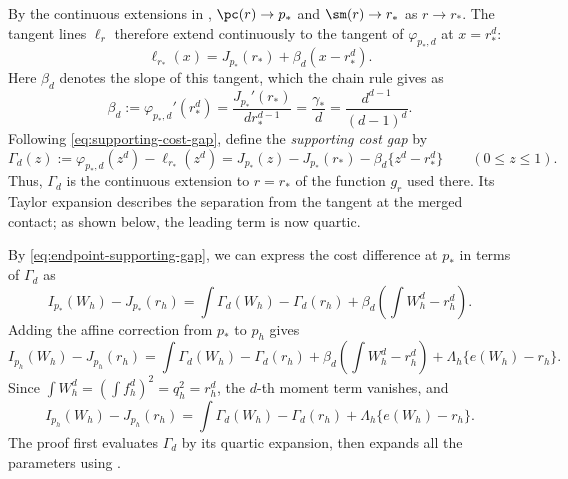 By the continuous extensions in ,
$\pc(r)\to p_*$ and $\sm(r)\to r_*$ as $r\to r_*$.  The tangent lines
$\ell_r$ therefore extend continuously to the tangent of
$\varphi_{p_*,d}$ at $x=r_*^d$:
\[
  \ell_{r_*}(x)=J_{p_*}(r_*)+\beta_d(x-r_*^d).
\]
Here $\beta_d$ denotes the slope of this tangent, which the chain rule gives as
\[
  \beta_d:=\varphi_{p_*,d}'(r_*^d)
  =\frac{J_{p_*}'(r_*)}{d r_*^{d-1}}
  =\frac{\gamma_*}{d}
  =\frac{d^{d-1}}{(d-1)^d}.
\]
Following \eqref{eq:supporting-cost-gap}, define the \emph{supporting cost gap} by
\begin{equation}\label{eq:endpoint-supporting-gap}
  \Gamma_d(z)
  :=\varphi_{p_*,d}(z^d)-\ell_{r_*}(z^d)
  =J_{p_*}(z)-J_{p_*}(r_*)-\beta_d\{z^d-r_*^d\}
  \qquad(0\le z\le1).
\end{equation}
Thus, $\Gamma_d$ is the continuous extension to $r=r_*$ of the function
$g_r$ used there.  Its Taylor expansion describes the separation from
the tangent at the merged contact; as shown below, the leading term is
now quartic.

By \eqref{eq:endpoint-supporting-gap}, we can express the cost difference
at $p_*$ in terms of $\Gamma_d$ as
\[
  I_{p_*}(W_h)-J_{p_*}(r_h)
  =\int\Gamma_d(W_h)-\Gamma_d(r_h)+\beta_d\left(\int W_h^d-r_h^d\right).
\]
Adding the affine correction from $p_*$ to $p_h$ gives
\begin{equation}\label{eq:constant-comparison-decomposition}
  I_{p_h}(W_h)-J_{p_h}(r_h)
  =\int\Gamma_d(W_h)-\Gamma_d(r_h)
  +\beta_d\left(\int W_h^d-r_h^d\right)
  +\Lambda_h\{e(W_h)-r_h\}.
\end{equation}
Since $\int W_h^d=(\int f_h^d)^2=q_h^2=r_h^d$, the $d$-th moment term vanishes, and
\begin{equation}\label{eq:constant-comparison-identity}
  I_{p_h}(W_h)-J_{p_h}(r_h)
  =\int\Gamma_d(W_h)-\Gamma_d(r_h) +\Lambda_h\{e(W_h)-r_h\}.
\end{equation}
The proof first evaluates $\Gamma_d$ by its quartic expansion,
then expands all the parameters using .


